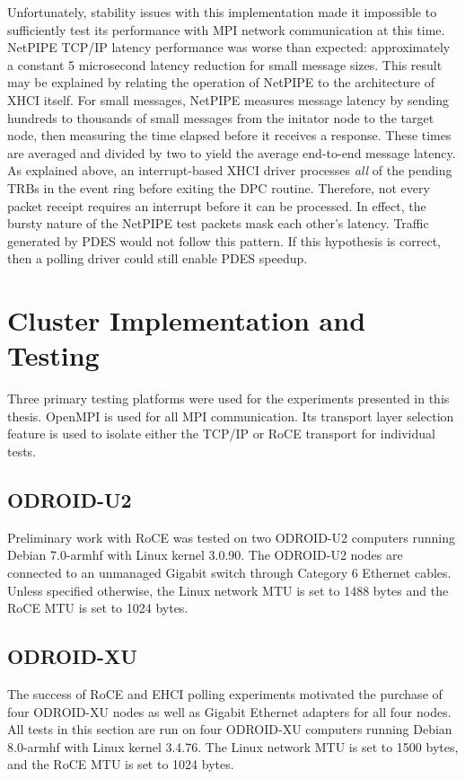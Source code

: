 \documentclass[11pt]{book}
\begin{document}
Unfortunately, stability issues with this implementation made it impossible to
sufficiently test its performance with MPI network communication at this time.  NetPIPE
TCP/IP latency performance was worse than expected: approximately a constant 5 microsecond
latency reduction for small message sizes. This result may be explained by relating the
operation of NetPIPE to the architecture of XHCI itself.  For small messages, NetPIPE
measures message latency by sending hundreds to thousands of small messages from the
initator node to the target node, then measuring the time elapsed before it receives a
response.  These times are averaged and divided by two to yield the average end-to-end
message latency.  As explained above, an interrupt-based XHCI driver processes \emph{all}
of the pending TRBs in the event ring before exiting the DPC routine.  Therefore, not
every packet receipt requires an interrupt before it can be processed.  In effect, the
bursty nature of the NetPIPE test packets mask each other's latency.  Traffic generated by
PDES would not follow this pattern.  If this hypothesis is correct, then a polling driver
could still enable PDES speedup.

\chapter{Cluster Implementation and Testing}\label{cluster}

Three primary testing platforms were used for the experiments presented in this thesis.
OpenMPI is used for all MPI communication.  Its transport layer selection feature is used
to isolate either the TCP/IP or RoCE transport for individual tests.

\section{ODROID-U2}

Preliminary work with RoCE was tested on two ODROID-U2 computers running Debian 7.0-armhf
with Linux kernel 3.0.90.  The ODROID-U2 nodes are connected to an unmanaged Gigabit
switch through Category 6 Ethernet cables.  Unless specified otherwise, the Linux network
MTU is set to 1488 bytes and the RoCE MTU is set to 1024 bytes.

\section{ODROID-XU}

The success of RoCE and EHCI polling experiments motivated the purchase of four ODROID-XU
nodes as well as Gigabit Ethernet adapters for all four nodes.  All tests in this section
are run on four ODROID-XU computers running Debian 8.0-armhf with Linux kernel 3.4.76.
The Linux network MTU is set to 1500 bytes, and the RoCE MTU is set to 1024 bytes.
\end{document}
